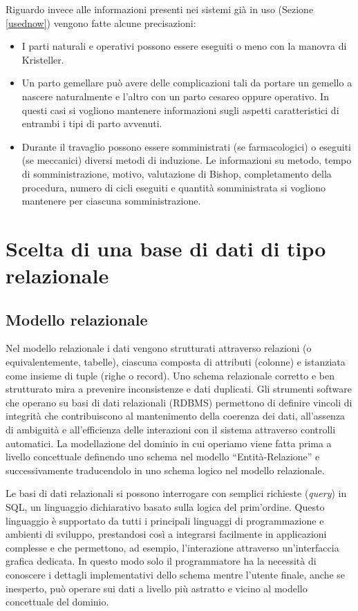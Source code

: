 Riguardo invece alle informazioni presenti nei sistemi già in uso (Sezione \ref{usednow}) vengono fatte alcune precisazioni:
\begin{itemize}
\item I parti naturali e operativi possono essere eseguiti o meno con la manovra di Kristeller.
\item Un parto gemellare può avere delle complicazioni tali da portare un gemello a nascere naturalmente e l'altro con un parto cesareo oppure operativo. In questi casi si vogliono mantenere informazioni sugli aspetti caratteristici di entrambi i tipi di parto avvenuti.
\item Durante il travaglio possono essere somministrati (se farmacologici) o eseguiti (se meccanici) diversi metodi di induzione. Le informazioni su metodo, tempo di somministrazione, motivo, valutazione di Bishop, completamento della procedura, numero di cicli eseguiti e quantità somministrata si vogliono mantenere per ciascuna somministrazione.
\end{itemize}

\section{Scelta di una base di dati di tipo relazionale}

\subsection{Modello relazionale}

Nel modello relazionale \cite{Cod70} i dati vengono strutturati attraverso relazioni (o equivalentemente, tabelle), ciascuna composta di attributi (colonne) e istanziata come insieme di tuple (righe o record).
Uno schema relazionale corretto e ben strutturato mira a prevenire inconsistenze e dati duplicati.
Gli strumenti software che operano su basi di dati relazionali (RDBMS) permettono di definire vincoli di integrità che contribuiscono al mantenimento della coerenza dei dati, all'assenza di ambiguità e all'efficienza delle interazioni con il sistema attraverso controlli automatici.
La modellazione del dominio in cui operiamo viene fatta prima a livello concettuale definendo uno schema nel modello \enquote{Entità-Relazione} e successivamente traducendolo in uno schema logico nel modello relazionale.

Le basi di dati relazionali si possono interrogare con semplici richieste (\emph{query}) in SQL, un linguaggio dichiarativo basato sulla logica del prim'ordine.
Questo linguaggio è supportato da tutti i principali linguaggi di programmazione e ambienti di sviluppo, prestandosi così a integrarsi facilmente in applicazioni complesse e che permettono, ad esempio, l'interazione attraverso un'interfaccia grafica dedicata.
In questo modo solo il programmatore ha la necessità di conoscere i dettagli implementativi dello schema mentre l'utente finale, anche se inesperto, può operare sui dati a livello più astratto e vicino al modello concettuale del dominio.

